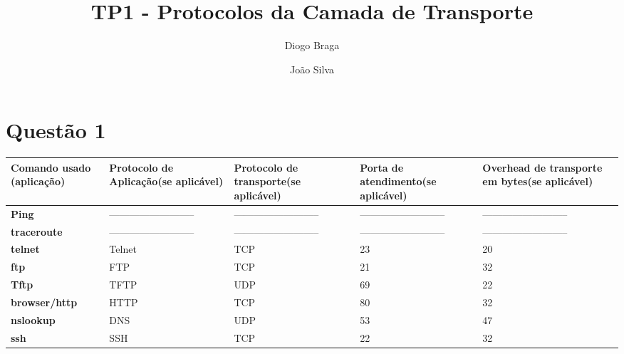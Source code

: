 \documentclass{llncs}
\begin{document}
\mainmatter
\title{TP1 - Protocolos da Camada de Transporte}


\author{Diogo Braga \and João Silva}



\date{}


\maketitle

\section{Questão 1}

\begin{center}
\begin{tabular}{ | m{3cm} | m{3cm} | m{3cm} | m{3cm} | m{3cm} |}
\hline
 \textbf{Comando usado (aplicação)} & \textbf{Protocolo de Aplicação(se aplicável)} & \textbf{Protocolo de transporte(se aplicável)} & \textbf{Porta de atendimento(se aplicável)} & \textbf{Overhead de transporte em bytes(se aplicável)} \\
 \hline
 \textbf{Ping} & -------------------------- & -------------------------- & -------------------------- & -------------------------- \\
 \hline
 \textbf{traceroute} & -------------------------- & -------------------------- & -------------------------- & -------------------------- \\
 \hline
 \textbf{telnet} & Telnet & TCP & 23 & 20 \\
 \hline
 \textbf{ftp} & FTP & TCP & 21 & 32 \\
 \hline
 \textbf{Tftp} & TFTP & UDP & 69 & 22 \\
 \hline
 \textbf{browser/http} & HTTP & TCP & 80 & 32 \\
 \hline
 \textbf{nslookup} & DNS & UDP & 53 & 47 \\
 \hline
 \textbf{ssh} & SSH & TCP & 22 & 32 \\
 \hline
\end{tabular}
\end{center}
\end{document}
